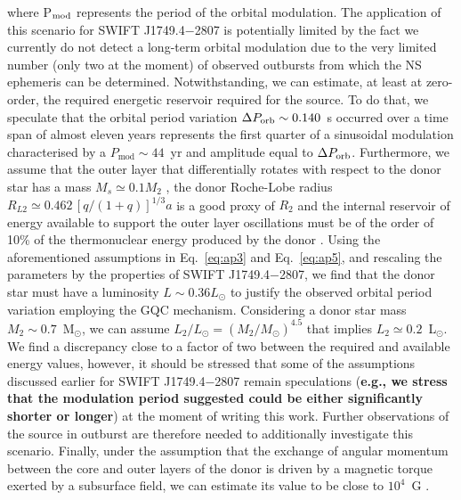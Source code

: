 \documentclass[fleqn,usenatbib]{mnras}
\newcommand{\swiftj}{SWIFT J1749.4$-$2807}
\begin{document}
where P$_{\rm mod}$ represents the period of the orbital modulation. 
The application of this scenario for \swiftj{} is potentially limited by the fact we currently do not detect a long-term orbital modulation due to the very limited number (only two at the moment) of observed outbursts from which the NS ephemeris can be determined. Notwithstanding, we can estimate, at least at zero-order, the required energetic reservoir required for the source. To do that, we speculate that the orbital period variation $\Delta P_{\rm orb}\sim0.140$~s occurred over a time span of almost eleven years represents the first quarter of a sinusoidal modulation characterised by a $P_\text{mod}\sim 44$~yr and amplitude equal to $\Delta P_{\rm orb}$. Furthermore, we assume that the outer layer that differentially rotates with respect to the donor star has a mass $M_s\simeq 0.1 M_2$ \citep{Applegate:1994vp}, the donor  Roche-Lobe radius $R_{L2}\simeq 0.462\, [q/(1+q)]^{1/3} a$ \citep[valid for mass ratio $q\leq0.8$;][]{Paczynski71} is a good proxy of $R_2$	and the internal reservoir of energy available to support the outer layer oscillations must be of the order of 10\% of the thermonuclear energy produced by the donor \citep{Applegate:1992uh}. Using the aforementioned assumptions in Eq.~\ref{eq:ap3} and Eq.~\ref{eq:ap5}, and rescaling the parameters by the properties of \swiftj{}, we find that the donor star must have a luminosity $L\sim0.36L_\odot$ to justify the observed orbital period variation employing the GQC mechanism. Considering a donor star mass $M_2\sim0.7$~M$_\odot$, we can assume $L_2/L_\odot=(M_2/M_\odot)^{4.5}$ that implies $L_2\simeq0.2$~L$_\odot$. We find a discrepancy close to a factor of two between the required and available energy values, however, it should be stressed that some of the assumptions discussed earlier for \swiftj{} remain speculations (\textbf{e.g., we stress that the modulation period suggested could be either significantly shorter or longer}) at the moment of writing this work. Further observations of the source in outburst are therefore needed to additionally investigate this scenario.
Finally, under the assumption that the exchange of angular momentum between the core and outer layers of the donor is driven by a magnetic torque exerted by a subsurface field, we can estimate its value to be close to $10^4$~G \citep[see][equation 23]{Applegate:1992uh}.
\end{document}
